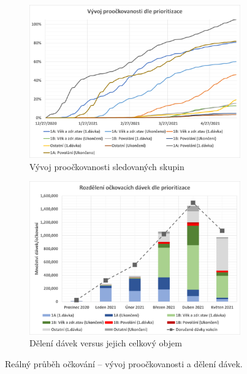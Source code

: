 \begin{figure}
\centering

\begin{subfigure}{0.9\textwidth}
\includegraphics[width=\textwidth]{assets/gr_proockovanost}
\caption{Vývoj proočkovanosti sledovaných skupin}
\label{gr_proockovanost}
\end{subfigure}

\begin{subfigure}{0.9\textwidth}
\includegraphics[width=\textwidth]{assets/gr_mesice}
\caption{Dělení dávek versus jejich celkový objem}
\label{gr_skupiny_davky}
\end{subfigure}

\caption{Reálný průběh očkování -- vývoj proočkovanosti a dělení dávek.}
\end{figure}

